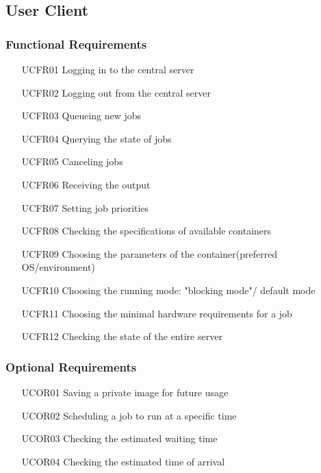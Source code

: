 \subsection{User Client}


  \subsubsection{Functional Requirements} 
  \begin{itemize}
    \item [UCFR01] Logging in to the central server
    \item [UCFR02] Logging out from the central server
    \item [UCFR03] Queueing new jobs
    \item [UCFR04] Querying the state of jobs
    \item [UCFR05] Canceling jobs
    \item [UCFR06] Receiving the output
    \item [UCFR07] Setting job priorities 
    \item [UCFR08] Checking the specifications of available containers
    \item [UCFR09] Choosing the parameters of the container(preferred OS/environment)
    \item [UCFR10] Choosing the running mode: "blocking mode"/ default mode
    \item [UCFR11] Choosing the minimal hardware requirements for a job 
    \item [UCFR12] Checking the state of the entire server
  \end{itemize}


  \subsubsection{Optional Requirements} 
  \begin{itemize}
    \item [UCOR01] Saving a private image for future usage
    \item [UCOR02] Scheduling a job to run at a specific time
    \item [UCOR03] Checking the estimated waiting time
    \item [UCOR04] Checking the estimated time of arrival
  \end{itemize}

